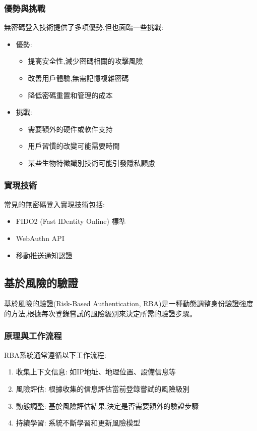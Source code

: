 \subsubsection{優勢與挑戰}
無密碼登入技術提供了多項優勢,但也面臨一些挑戰:
\begin{itemize}
  \item 優勢:
        \begin{itemize}
          \item 提高安全性,減少密碼相關的攻擊風險
          \item 改善用戶體驗,無需記憶複雜密碼
          \item 降低密碼重置和管理的成本
        \end{itemize}
  \item 挑戰:
        \begin{itemize}
          \item 需要額外的硬件或軟件支持
          \item 用戶習慣的改變可能需要時間
          \item 某些生物特徵識別技術可能引發隱私顧慮
        \end{itemize}
\end{itemize}
\subsubsection{實現技術}
常見的無密碼登入實現技術包括:
\begin{itemize}
  \item FIDO2 (Fast IDentity Online) 標準
  \item WebAuthn API
  \item 移動推送通知認證
\end{itemize}

\subsection{基於風險的驗證}
基於風險的驗證(Risk-Based Authentication, RBA)是一種動態調整身份驗證強度的方法,根據每次登錄嘗試的風險級別來決定所需的驗證步驟。
\subsubsection{原理與工作流程}
RBA系統通常遵循以下工作流程:
\begin{enumerate}
  \item 收集上下文信息: 如IP地址、地理位置、設備信息等
  \item 風險評估: 根據收集的信息評估當前登錄嘗試的風險級別
  \item 動態調整: 基於風險評估結果,決定是否需要額外的驗證步驟
  \item 持續學習: 系統不斷學習和更新風險模型
\end{enumerate}

